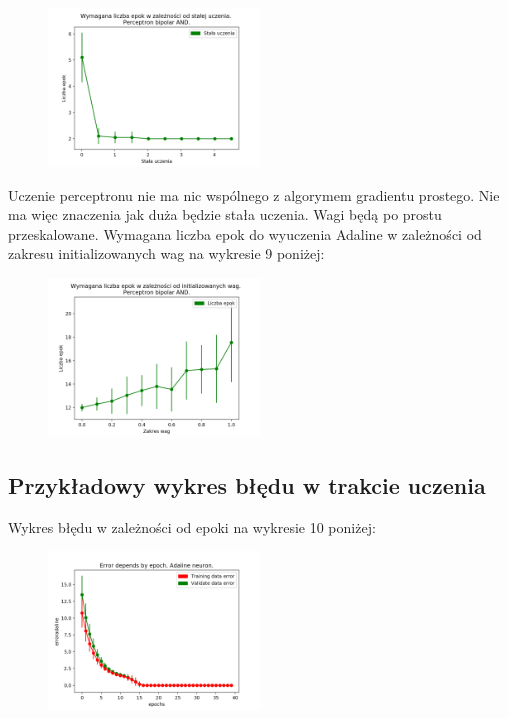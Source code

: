 \documentclass{article}
\begin{document}
	\begin{figure}[h]

		\centering
		\caption{}
		\includegraphics[width=0.5\textwidth]{epoki_rate_perceptron_bipolar.png}
		
	\end{figure}  
	Uczenie perceptronu nie ma nic wspólnego z algorymem gradientu prostego. Nie ma więc znaczenia jak duża będzie stała uczenia. Wagi będą po prostu przeskalowane.
		\newpage
	Wymagana liczba epok do wyuczenia Adaline w zależności od zakresu initializowanych wag na wykresie 9 poniżej:
	
	\begin{figure}[h]

		\centering
		\caption{}
		\includegraphics[width=0.5\textwidth]{epoki_wagi_perceptron_bipolar.png}
		
	\end{figure}   
	
	\subsection{Przykładowy wykres błędu w trakcie uczenia}
	Wykres błędu w zależności od epoki na wykresie 10 poniżej:
	
	\begin{figure}[h]
		\centering
		\caption{}
		\includegraphics[width=0.5\textwidth]{adaline_and.png}
		
	\end{figure}  
\newpage	
\end{document}
